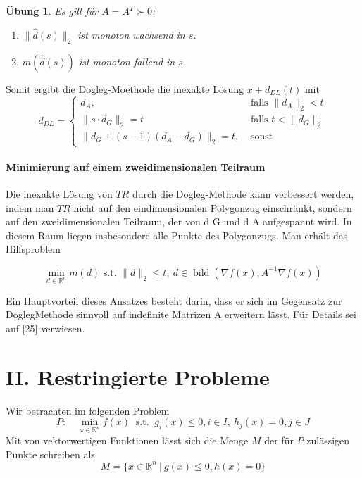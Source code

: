 \documentclass[11pt]{scrreprt}
\newcounter{thm}
\theoremstyle{thmstyle}
\numberwithin{thm}{section}
\newtheorem{uebung}[thm]{Übung}
\begin{document}
\begin{uebung}
	Es gilt für $A = A^T \succ 0$:
	\begin{enumerate}[label=\alph*\upshape)]
		\item $\|\hat{d}(s)\|_2$ ist monoton wachsend in $s$.
		\item $m(\hat{d}(s))$ ist monoton fallend in $s$.
	\end{enumerate}
\end{uebung}

Somit ergibt die Dogleg-Moethode die inexakte Lösung $x + d_{DL}(t)$ mit
$$ d_{DL} = \begin{cases}
 d_A, & \text{ falls } \| d_A \|_2 < t \\ \| s \cdot d_G \|_2 = t & \text{ falls } t < \| d_G \|_2 \\ \| d_G + (s - 1) (d_A - d_G) \|_2= t, & \text{ sonst}	
 \end{cases}
 $$
 
 \subsubsection*{Minimierung auf einem zweidimensionalen Teilraum}

Die inexakte Lösung von $TR$ durch die Dogleg-Methode kann verbessert werden, indem man $TR$ nicht auf den eindimensionalen Polygonzug einschränkt, sondern auf den zweidimensionalen Teilraum, der von d G und d A aufgespannt wird. In diesem Raum liegen insbesondere alle Punkte des Polygonzugs. Man erhält das Hilfsproblem

$$ \min_{d \in \mathbb{R}^n} m(d) \text{ s.t. } \| d \|_2 \leq t, ~ d \in \operatorname{bild}(\nabla f(x), A^{-1} \nabla f(x)) $$

Ein Hauptvorteil dieses Ansatzes besteht darin, dass er sich im Gegensatz zur DoglegMethode sinnvoll auf indefinite Matrizen A erweitern lässt. Für Details sei auf [25] verwiesen.

\chapter*{II. Restringierte Probleme}

\setcounter{chapter}{3}
\setcounter{section}{1}
\setcounter{thm}{0}

Wir betrachten im folgenden Problem
$$ P: \quad \min_{x \in \mathbb{R}^n} f(x) ~\text{ s.t. }~ g_i(x) \leq 0, i \in I, ~ h_j(x) = 0, j \in J $$
Mit von vektorwertigen Funktionen lässt sich die Menge $M$ der für $P$ zulässigen Punkte schreiben als
$$ M = \big\{ x \in \mathbb{R}^n ~|~ g(x) \leq 0, h(x) = 0 \big\} $$
\end{document}
